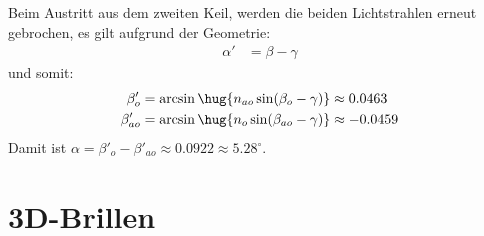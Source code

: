 \documentclass[ex]{exercise}
\begin{document}
Beim Austritt aus dem zweiten Keil, werden die beiden Lichtstrahlen erneut gebrochen, 
es gilt aufgrund der Geometrie:
\begin{align*}
    \alpha' &= \beta - \gamma 
\end{align*}
und somit:
\begin{align*}
    \beta'_o &= \arcsin\hug{n_{ao}\sin(\beta_o - \gamma)} \approx 0.0463 \\
    \beta'_{ao} &= \arcsin\hug{n_{o}\sin(\beta_{ao}- \gamma)} \approx -0.0459
\end{align*}
Damit ist \(\alpha = \beta'_{o} - \beta'_{ao}\approx 0.0922\approx 5.28^\circ\). 

\section{3D-Brillen}
\end{document}
